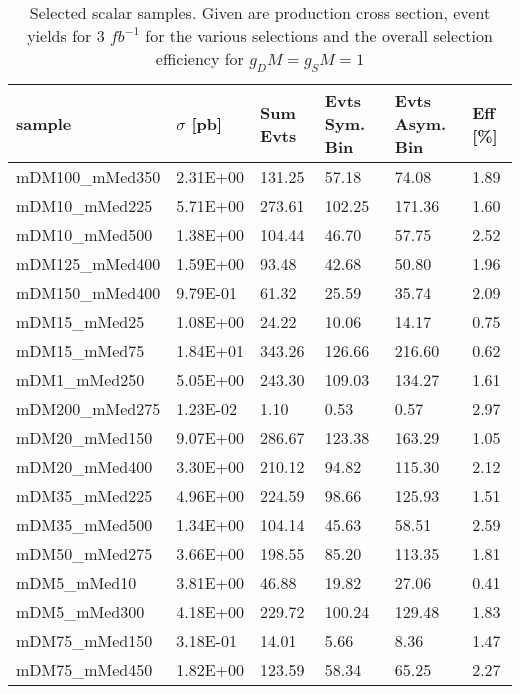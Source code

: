 \begin{table}[h]
\centering
\begin{tabular}{llllll}
\hline
sample             & $\sigma$ [pb] & Sum Evts       & Evts Sym. Bin & Evts Asym. Bin & Eff  [\%]   \\\hline
mDM100\_mMed350 & 2.31E+00 & 131.25 & 57.18  & 74.08  & 1.89 \\
mDM10\_mMed225  & 5.71E+00 & 273.61 & 102.25 & 171.36 & 1.60 \\
mDM10\_mMed500  & 1.38E+00 & 104.44 & 46.70  & 57.75  & 2.52 \\
mDM125\_mMed400 & 1.59E+00 & 93.48  & 42.68  & 50.80  & 1.96 \\
mDM150\_mMed400 & 9.79E-01 & 61.32  & 25.59  & 35.74  & 2.09 \\
mDM15\_mMed25   & 1.08E+00 & 24.22  & 10.06  & 14.17  & 0.75 \\
mDM15\_mMed75   & 1.84E+01 & 343.26 & 126.66 & 216.60 & 0.62 \\
mDM1\_mMed250   & 5.05E+00 & 243.30 & 109.03 & 134.27 & 1.61 \\
mDM200\_mMed275 & 1.23E-02 & 1.10   & 0.53   & 0.57   & 2.97 \\
mDM20\_mMed150  & 9.07E+00 & 286.67 & 123.38 & 163.29 & 1.05 \\
mDM20\_mMed400  & 3.30E+00 & 210.12 & 94.82  & 115.30 & 2.12 \\
mDM35\_mMed225  & 4.96E+00 & 224.59 & 98.66  & 125.93 & 1.51 \\
mDM35\_mMed500  & 1.34E+00 & 104.14 & 45.63  & 58.51  & 2.59 \\
mDM50\_mMed275  & 3.66E+00 & 198.55 & 85.20  & 113.35 & 1.81 \\
mDM5\_mMed10    & 3.81E+00 & 46.88  & 19.82  & 27.06  & 0.41 \\
mDM5\_mMed300   & 4.18E+00 & 229.72 & 100.24 & 129.48 & 1.83 \\
mDM75\_mMed150  & 3.18E-01 & 14.01  & 5.66   & 8.36   & 1.47 \\
mDM75\_mMed450  & 1.82E+00 & 123.59 & 58.34  & 65.25  & 2.27\\
\hline
\end{tabular}
\caption{Selected scalar samples. Given are production cross section, event yields for 3 $fb^{-1 }$ for the various selections and the overall selection efficiency for $g_DM=g_SM=1$}
\label{tab:dm_S_g1_3fb}
\end{table}


